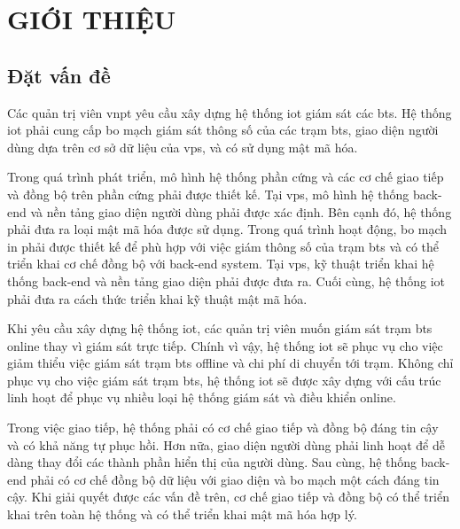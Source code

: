 \chapter{GIỚI THIỆU}
\label{Chapter1}

\section{Đặt vấn đề}

Các quản trị viên \acrfull{vnpt} yêu cầu xây dựng hệ thống \acrfull{iot} giám sát các \acrfull{bts}. Hệ thống \acrshort{iot} phải cung cấp bo mạch giám sát thông số của các trạm \acrshort{bts}, giao diện người dùng dựa trên cơ sở dữ liệu của \acrfull{vps}, và có sử dụng mật mã hóa.

Trong quá trình phát triển, mô hình hệ thống phần cứng và các cơ chế giao tiếp và đồng bộ trên phần cứng phải được thiết kế. Tại \acrshort{vps}, mô hình hệ thống back-end và nền tảng giao diện người dùng phải được xác định. Bên cạnh đó, hệ thống phải đưa ra loại mật mã hóa được sử dụng. Trong quá trình hoạt động, bo mạch in phải được thiết kế để phù hợp với việc giám thông số của trạm \acrshort{bts} và có thể triển khai cơ chế đồng bộ với back-end system. Tại \acrshort{vps}, kỹ thuật triển khai hệ thống back-end và nền tảng giao diện phải được đưa ra. Cuối cùng, hệ thống \acrshort{iot} phải đưa ra cách thức triển khai kỹ thuật mật mã hóa.

Khi yêu cầu xây dựng hệ thống \acrshort{iot}, các quản trị viên muốn giám sát trạm \acrshort{bts} online thay vì giám sát trực tiếp. Chính vì vậy, hệ thống \acrshort{iot} sẽ phục vụ cho việc giảm thiểu việc giám sát trạm \acrshort{bts} offline và chi phí di chuyển tới trạm. 
Không chỉ phục vụ cho việc giám sát trạm \acrshort{bts}, hệ thống \acrshort{iot} sẽ được xây dựng với cấu trúc linh hoạt để phục vụ nhiều loại hệ thống giám sát và điều khiển online.

Trong việc giao tiếp, hệ thống phải có cơ chế giao tiếp và đồng bộ đáng tin cậy và có khả năng tự phục hồi. Hơn nữa, giao diện người dùng phải linh hoạt để dễ dàng thay đổi các thành phần hiển thị của người dùng. Sau cùng, hệ thống back-end phải có cơ chế đồng bộ dữ liệu với giao diện và bo mạch một cách đáng tin cậy. Khi giải quyết được các vấn đề trên, cơ chế giao tiếp và đồng bộ có thể triển khai trên toàn hệ thống và có thể triển khai mật mã hóa hợp lý.

